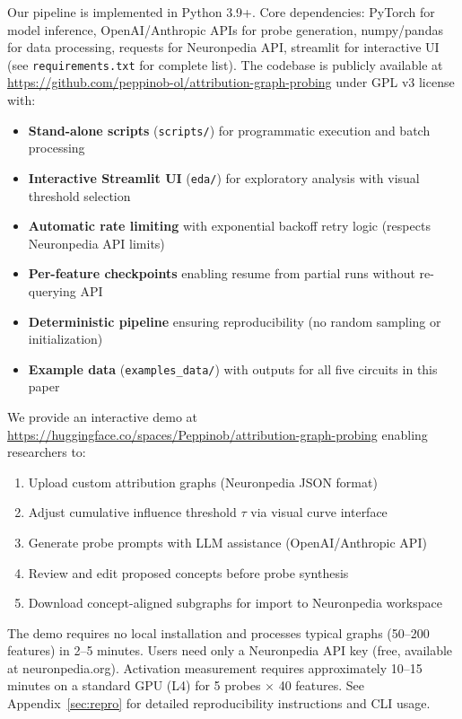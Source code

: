 Our pipeline is implemented in Python 3.9+. Core dependencies: PyTorch for model inference, OpenAI/Anthropic APIs for probe generation, numpy/pandas for data processing, requests for Neuronpedia API, streamlit for interactive UI (see \texttt{requirements.txt} for complete list). The codebase is publicly available at \url{https://github.com/peppinob-ol/attribution-graph-probing} under GPL v3 license with:

\begin{itemize}
  \item \textbf{Stand-alone scripts} (\texttt{scripts/}) for programmatic execution and batch processing
  \item \textbf{Interactive Streamlit UI} (\texttt{eda/}) for exploratory analysis with visual threshold selection
  \item \textbf{Automatic rate limiting} with exponential backoff retry logic (respects Neuronpedia API limits)
  \item \textbf{Per-feature checkpoints} enabling resume from partial runs without re-querying API
  \item \textbf{Deterministic pipeline} ensuring reproducibility (no random sampling or initialization)
  \item \textbf{Example data} (\texttt{examples\_data/}) with outputs for all five circuits in this paper
\end{itemize}

We provide an interactive demo at \url{https://huggingface.co/spaces/Peppinob/attribution-graph-probing} enabling researchers to:

\begin{enumerate}
  \item Upload custom attribution graphs (Neuronpedia JSON format)
  \item Adjust cumulative influence threshold $\tau$ via visual curve interface
  \item Generate probe prompts with LLM assistance (OpenAI/Anthropic API)
  \item Review and edit proposed concepts before probe synthesis
  \item Download concept-aligned subgraphs for import to Neuronpedia workspace
\end{enumerate}

The demo requires no local installation and processes typical graphs (50--200 features) in 2--5 minutes. Users need only a Neuronpedia API key (free, available at neuronpedia.org). Activation measurement requires approximately 10--15 minutes on a standard GPU (L4) for 5 probes $\times$ 40 features. See Appendix~\ref{sec:repro} for detailed reproducibility instructions and CLI usage.


